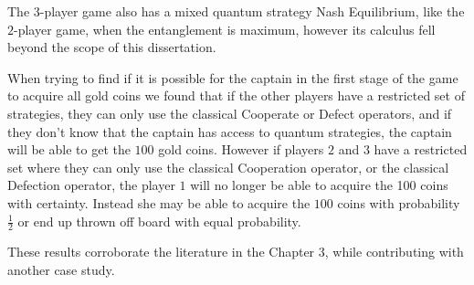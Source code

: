 \documentclass[10pt,twocolumn]{llncs}
\begin{document}
The $3$-player game also has a mixed quantum strategy Nash Equilibrium, like the $2$-player game, when the entanglement is maximum, however its calculus fell beyond the scope of this dissertation. 

When trying to find if it is possible for the captain in the first stage of the game to acquire all gold coins we found that if the other players have a restricted set of strategies, they can only use the classical Cooperate or Defect operators, and if they don't know that the captain has access to quantum strategies, the captain will be able to get the $100$ gold coins. However if players $2$ and $3$ have a restricted set where they can only use the classical Cooperation operator, or the classical Defection operator, the player $1$ will no longer be able to acquire the 100 coins with certainty. Instead she may be able to acquire the $100$ coins with probability $\frac{1}{2}$ or end up thrown off board with equal probability.

These results corroborate the literature in the Chapter 3, while contributing with another case study.

 
 






%
%
%
%



\end{document}
